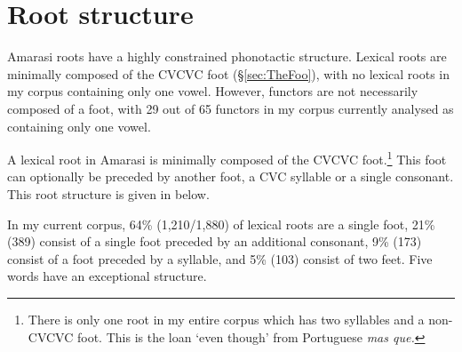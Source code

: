 \section{Root structure}\label{sec:RooStr}
Amarasi roots have a highly constrained phonotactic structure.
Lexical roots are minimally composed of the CVCVC foot ({\S}\ref{sec:TheFoo}),
with no lexical roots in my corpus containing only one vowel.
However, functors are not necessarily composed of a foot,
with 29 out of 65 functors in my corpus
currently analysed as containing only one vowel.

A lexical root in Amarasi is minimally composed of the CVCVC foot.\footnote{
		There is only one root in my entire corpus which
		has two syllables and a non-CVCVC foot.
		This is the loan  `even though' from Portuguese \it{mas que}.}
This foot can optionally be preceded by another foot,
a CVC syllable or a single consonant.
This root structure is given in  below.

\begin{exe}
	\label{ex:Root->SFt}
\end{exe}

In my current corpus, 64{\%} (1,210/1,880) of lexical roots are a single foot,
21{\%} (389) consist of a single foot preceded by an additional consonant,
9{\%} (173) consist of a foot preceded by a syllable, and 5{\%} (103) consist of two feet.
Five words have an exceptional structure.
